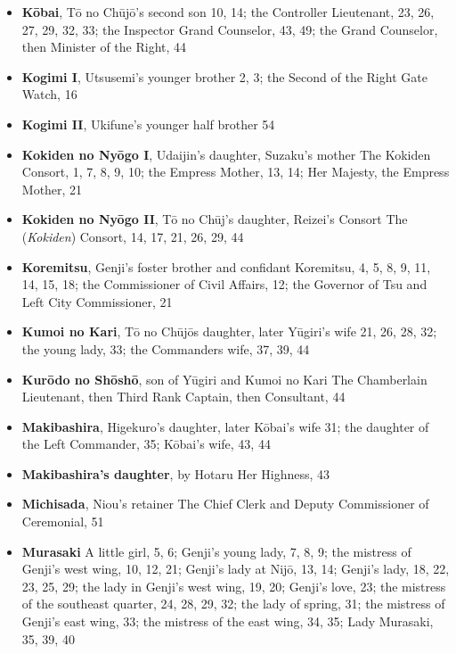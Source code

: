 \documentclass{article}
\begin{document}
\begin{multicols}{2}
\begin{itemize}[
			label=,
			leftmargin=0em,
			rightmargin=-1.5em,
			itemindent=-2em,
			nosep,
		]
		\item \textbf{Kōbai}, Tō no Chūjō's second son 10, 14;
		      the Controller Lieutenant, 23, 26, 27, 29, 32, 33;
		      the Inspector Grand Counselor, 43, 49;
		      the Grand Counselor, then Minister of the Right, 44

		\item \textbf{Kogimi I}, Utsusemi's younger brother 2, 3;
		      the Second of the Right Gate Watch, 16

		\item \textbf{Kogimi II}, Ukifune's younger half brother 54

		\item \textbf{Kokiden no Nyōgo I}, Udaijin's daughter, Suzaku's mother The Kokiden Consort, 1, 7, 8, 9, 10;
		      the Empress Mother, 13, 14;
		      Her Majesty, the Empress Mother, 21

		\item \textbf{Kokiden no Nyōgo II}, Tō no Chūj's daughter, Reizei's Consort The (\textit{Kokiden}) Consort, 14, 17, 21, 26, 29, 44

		\item \textbf{Koremitsu}, Genji's foster brother and confidant Koremitsu, 4, 5, 8, 9, 11, 14, 15, 18;
		      the Commissioner of Civil Affairs, 12;
		      the Governor of Tsu and Left City Commissioner, 21

		\item \textbf{Kumoi no Kari}, Tō no Chūjōs daughter, later Yūgiri's wife 21, 26, 28, 32;
		      the young lady, 33;
		      the Commanders wife, 37, 39, 44

		\item \textbf{Kurōdo no Shōshō}, son of Yūgiri and Kumoi no Kari The Chamberlain Lieutenant, then Third Rank Captain, then Consultant, 44

		\item \textbf{Makibashira}, Higekuro's daughter, later Kōbai's wife 31;
		      the daughter of the Left Commander, 35;
		      Kōbai's wife, 43, 44

		\item \textbf{Makibashira's daughter}, by Hotaru Her Highness, 43

		\item \textbf{Michisada}, Niou's retainer The Chief Clerk and Deputy Commissioner of Ceremonial, 51

		\item \textbf{Murasaki} A little girl, 5, 6;
		      Genji's young lady, 7, 8, 9;
		      the mistress of Genji's west wing, 10, 12, 21;
		      Genji's lady at Nijō, 13, 14;
		      Genji's lady, 18, 22, 23, 25, 29;
		      the lady in Genji's west wing, 19, 20;
		      Genji's love, 23;
		      the mistress of the southeast quarter, 24, 28, 29, 32;
		      the lady of spring, 31;
		      the mistress of Genji's east wing, 33;
		      the mistress of the east wing, 34, 35;
		      Lady Murasaki, 35, 39, 40


\end{itemize}
\end{multicols}
\end{document}
